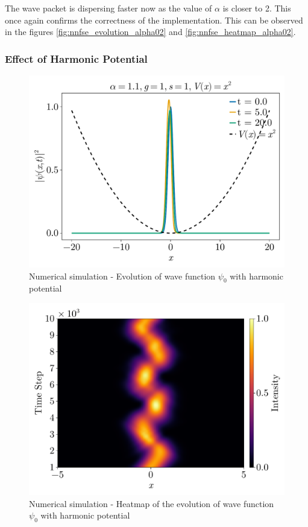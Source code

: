 \documentclass[8pt, a4paper, twocolumn]{article}
\begin{document}
The wave packet is dispersing faster now as the value of $\alpha$ is closer to 2. This once again confirms
the correctness of the implementation. This can be observed in the figures \ref{fig:nnfse_evolution_alpha02} and
\ref{fig:nnfse_heatmap_alpha02}.

\subsubsection{Effect of Harmonic Potential}

\begin{figure}[h!]
	\centering
	\includegraphics[width=\linewidth]{../figs/fnlse_evolution_har.pdf}
	\caption{Numerical simulation - Evolution of wave function $\psi_0$ with harmonic potential}
	\label{fig:nnfse_evolution_harmonic}
\end{figure}
\begin{figure}
	\centering
	\includegraphics[width=\linewidth]{../figs/fnlse_heatmap_har.pdf}
	\caption{Numerical simulation - Heatmap of the evolution of wave function $\psi_0$ with harmonic potential}
	\label{fig:nnfse_heatmap_harmonic}
\end{figure}
\end{document}
